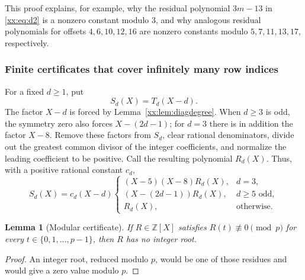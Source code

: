 \documentclass[11pt,a4paper]{article}
\numberwithin{equation}{section}
\newtheorem{lemma}[theorem]{Lemma}
\theoremstyle{definition}
\theoremstyle{remark}
\theoremstyle{plain}
\newcommand{\Z}{\mathbb Z}
\begin{document}
This proof explains, for example, why the residual polynomial $3m-13$ in
\eqref{xx:eq:d2} is a nonzero constant modulo $3$, and why analogous residual
polynomials for offsets $4,6,10,12,16$ are nonzero constants modulo
$5,7,11,13,17$, respectively.

\subsubsection{Finite certificates that cover infinitely many row indices}
For a fixed $d\ge1$, put
\[
 S_d(X)=T_d(X-d).
\]
The factor $X-d$ is forced by Lemma~\ref{xx:lem:diagdegree}. When $d\ge3$ is
odd, the symmetry zero also forces $X-(2d-1)$; for $d=3$ there is in
addition the factor $X-8$.
Remove these factors from $S_d$, clear rational denominators, divide out
the greatest common divisor of the integer coefficients, and normalize the
leading coefficient to be positive. Call the resulting polynomial $R_d(X)$.
Thus, with a positive rational constant $c_d$,
\begin{equation}\label{xx:eq:Rd}
 S_d(X)=c_d(X-d)
 \begin{cases}
 (X-5)(X-8)R_d(X),&d=3,\\
 (X-(2d-1))R_d(X),&d\ge5\text{ odd},\\
 R_d(X),&\text{otherwise}.
 \end{cases}
\end{equation}

\begin{lemma}[Modular certificate]\label{xx:lem:modcert}
If $R\in\Z[X]$ satisfies $R(t)\not\equiv0\pmod p$ for every
$t\in\{0,1,\ldots,p-1\}$, then $R$ has no integer root.
\end{lemma}
\begin{proof}
An integer root, reduced modulo $p$, would be one of those residues and
would give a zero value modulo $p$.
\end{proof}
\end{document}
